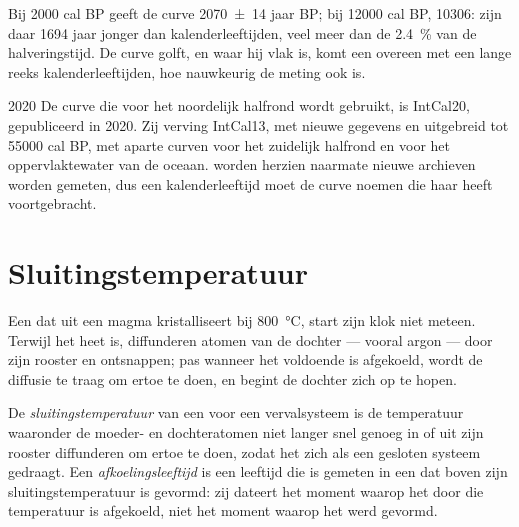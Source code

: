 Bij \num{2000} cal BP geeft de curve \num[uncertainty-mode=separate]{2070 \pm 14} jaar BP; bij \num{12000} cal BP, \num{10306}:  zijn daar \num{1694} jaar jonger dan kalenderleeftijden, veel meer dan de \qty{2.4}{\percent} van de halveringstijd. De curve golft, en waar hij vlak is, komt een  overeen met een lange reeks kalenderleeftijden, hoe nauwkeurig de meting ook is.

\begin{dated}{2020}
De curve die voor het noordelijk halfrond wordt gebruikt, is IntCal20, gepubliceerd in 2020. Zij verving IntCal13, met nieuwe gegevens en uitgebreid tot \num{55000} cal BP, met aparte curven voor het zuidelijk halfrond en voor het oppervlaktewater van de oceaan.  worden herzien naarmate nieuwe archieven worden gemeten, dus een kalenderleeftijd moet de curve noemen die haar heeft voortgebracht.
\end{dated}

\section{Sluitingstemperatuur}\label{sec:b1:radiometric-methods:closure}

Een  dat uit een magma kristalliseert bij \qty{800}{\celsius}, start zijn klok niet meteen. Terwijl het heet is, diffunderen atomen van de dochter --- vooral argon --- door zijn rooster en ontsnappen; pas wanneer het voldoende is afgekoeld, wordt de diffusie te traag om ertoe te doen, en begint de dochter zich op te hopen.

\begin{definition}\label{def:b1:radiometric-methods:closure}
De \emph{sluitingstemperatuur} van een  voor een vervalsysteem is de temperatuur waaronder de moeder- en dochteratomen niet langer snel genoeg in of uit zijn rooster diffunderen om ertoe te doen, zodat het  zich als een gesloten systeem gedraagt. Een \emph{afkoelingsleeftijd} is een leeftijd die is gemeten in een  dat boven zijn sluitingstemperatuur is gevormd: zij dateert het moment waarop het  door die temperatuur is afgekoeld, niet het moment waarop het werd gevormd.
\end{definition}

